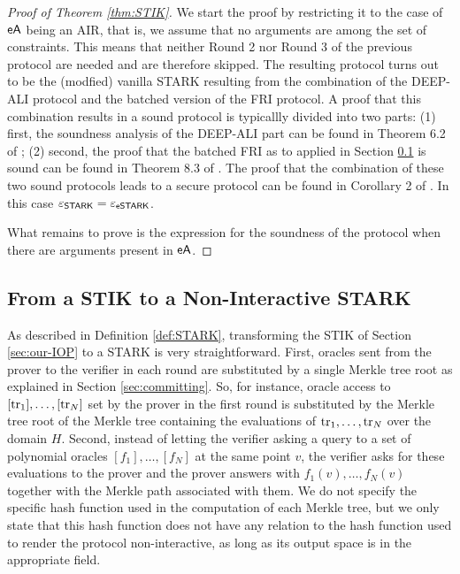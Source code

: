 \begin{proof}[Proof of Theorem \ref{thm:STIK}]
We start the proof by restricting it to the case of $\textsf{eA}$ being an AIR, that is, we assume that no arguments are among the set of constraints. This means that neither Round 2 nor Round 3 of the previous protocol are needed and are therefore skipped. The resulting protocol turns out to be the (modfied) vanilla STARK resulting from the combination of the DEEP-ALI protocol and the batched version of the FRI protocol. A proof that this combination results in a sound protocol is typicallly divided into two parts: (1) first, the soundness analysis of the DEEP-ALI part can be found in Theorem 6.2 of \cite{EPRINT:BGKS19}; (2) second, the proof that the batched FRI as to applied in Section \ref{sec:STIK-to-STARK} is sound can be found in Theorem 8.3 of \cite{EPRINT:BCIKS20}. The proof that the combination of these two sound protocols leads to a secure protocol can be found in Corollary 2 of \cite{EPRINT:StarkWare21}. In this case $\varepsilon_{\textsf{STARK}} = \varepsilon_{\textsf{eSTARK}}$.

What remains to prove is the expression for the soundness of the protocol when there are arguments present in $\textsf{eA}$. 
\end{proof}

\fi

\subsection{From a STIK to a Non-Interactive STARK}\label{sec:STIK-to-STARK}

As described in Definition \ref{def:STARK}, transforming the STIK of Section \ref{sec:our-IOP} to a STARK is very straightforward. First, oracles sent from the prover to the verifier in each round are substituted by a single Merkle tree root as explained in Section \ref{sec:committing}. So, for instance, oracle access to $[\text{tr}_1],\dots,[\text{tr}_N]$ set by the prover in the first round is substituted by the Merkle tree root of the Merkle tree containing the evaluations of $\text{tr}_1,\dots,\text{tr}_N$ over the domain $H$. Second, instead of letting the verifier asking a query to a set of polynomial oracles $[f_1],\dots,[f_N]$ at the same point $v$, the verifier asks for these evaluations to the prover and the prover answers with $f_1(v),\dots,f_N(v)$ together with the Merkle path associated with them. We do not specify the specific hash function used in the computation of each Merkle tree, but we only state that this hash function does not have any relation to the hash function used to render the protocol non-interactive, as long as its output space is in the appropriate field.

